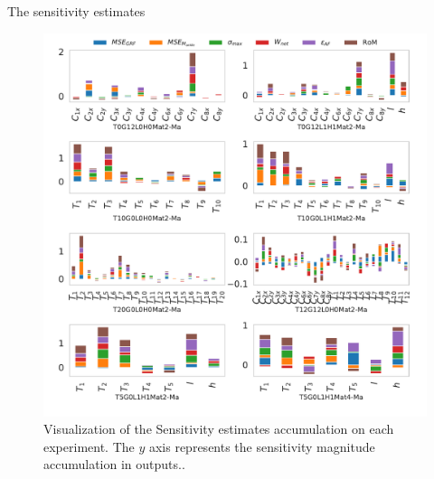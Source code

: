 \documentclass[10pt]{beamer}
\begin{document}
\begin{frame}{The sensitivity estimates}
\begin{footnotesize}
\begin{figure}
\centerline{\includegraphics[scale=0.3]{Feathergraphics/SensitivityestimatesFEAmodel.pdf}}
\caption{Visualization of the Sensitivity estimates accumulation on each experiment. The $y$ axis represents the sensitivity magnitude accumulation in outputs.\label{fig:sensitivity_LHS}.}
\end{figure}
\end{footnotesize}
\end{frame}
\end{document}
